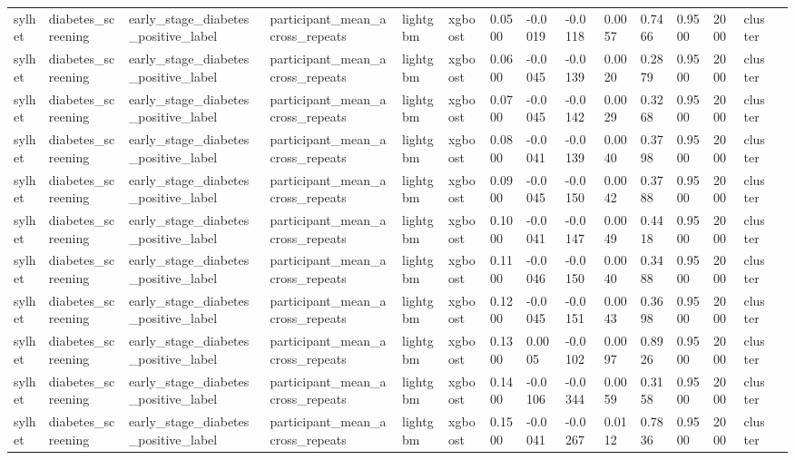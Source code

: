 \begin{tabular}{lllllllllllllll}
sylhet & diabetes\_screening & early\_stage\_diabetes\_positive\_label & participant\_mean\_across\_repeats & lightgbm & xgboost & 0.0500 & -0.0019 & -0.0118 & 0.0057 & 0.7466 & 0.9500 & 2000 & cluster &  \\
sylhet & diabetes\_screening & early\_stage\_diabetes\_positive\_label & participant\_mean\_across\_repeats & lightgbm & xgboost & 0.0600 & -0.0045 & -0.0139 & 0.0020 & 0.2879 & 0.9500 & 2000 & cluster &  \\
sylhet & diabetes\_screening & early\_stage\_diabetes\_positive\_label & participant\_mean\_across\_repeats & lightgbm & xgboost & 0.0700 & -0.0045 & -0.0142 & 0.0029 & 0.3268 & 0.9500 & 2000 & cluster &  \\
sylhet & diabetes\_screening & early\_stage\_diabetes\_positive\_label & participant\_mean\_across\_repeats & lightgbm & xgboost & 0.0800 & -0.0041 & -0.0139 & 0.0040 & 0.3798 & 0.9500 & 2000 & cluster &  \\
sylhet & diabetes\_screening & early\_stage\_diabetes\_positive\_label & participant\_mean\_across\_repeats & lightgbm & xgboost & 0.0900 & -0.0045 & -0.0150 & 0.0042 & 0.3788 & 0.9500 & 2000 & cluster &  \\
sylhet & diabetes\_screening & early\_stage\_diabetes\_positive\_label & participant\_mean\_across\_repeats & lightgbm & xgboost & 0.1000 & -0.0041 & -0.0147 & 0.0049 & 0.4418 & 0.9500 & 2000 & cluster &  \\
sylhet & diabetes\_screening & early\_stage\_diabetes\_positive\_label & participant\_mean\_across\_repeats & lightgbm & xgboost & 0.1100 & -0.0046 & -0.0150 & 0.0040 & 0.3488 & 0.9500 & 2000 & cluster &  \\
sylhet & diabetes\_screening & early\_stage\_diabetes\_positive\_label & participant\_mean\_across\_repeats & lightgbm & xgboost & 0.1200 & -0.0045 & -0.0151 & 0.0043 & 0.3698 & 0.9500 & 2000 & cluster &  \\
sylhet & diabetes\_screening & early\_stage\_diabetes\_positive\_label & participant\_mean\_across\_repeats & lightgbm & xgboost & 0.1300 & 0.0005 & -0.0102 & 0.0097 & 0.8926 & 0.9500 & 2000 & cluster &  \\
sylhet & diabetes\_screening & early\_stage\_diabetes\_positive\_label & participant\_mean\_across\_repeats & lightgbm & xgboost & 0.1400 & -0.0106 & -0.0344 & 0.0059 & 0.3158 & 0.9500 & 2000 & cluster &  \\
sylhet & diabetes\_screening & early\_stage\_diabetes\_positive\_label & participant\_mean\_across\_repeats & lightgbm & xgboost & 0.1500 & -0.0041 & -0.0267 & 0.0112 & 0.7836 & 0.9500 & 2000 & cluster &  \\

\end{tabular}

